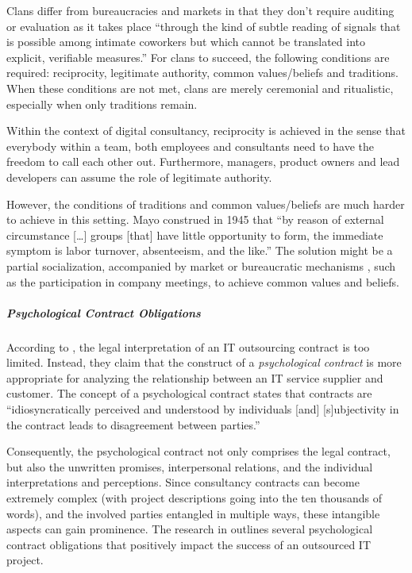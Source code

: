\documentclass[12pt]{article}
\begin{document}
Clans differ from bureaucracies and markets in that they don't require
auditing or evaluation as it takes place ``through the kind of subtle
reading of signals that is possible among intimate coworkers but which
cannot be translated into explicit, verifiable measures.'' \citep[
137]{ouchi1980} For clans to succeed, the following conditions are
required: reciprocity, legitimate authority, common values/beliefs and
traditions. When these conditions are not met, clans are merely
ceremonial and ritualistic, especially when only traditions remain.

Within the context of digital consultancy, reciprocity is achieved in
the sense that everybody within a team, both employees and consultants
need to have the freedom to call each other out. Furthermore, managers,
product owners and lead developers can assume the role of legitimate
authority.

However, the conditions of traditions and common values/beliefs are much
harder to achieve in this setting. Mayo construed in 1945 that ``by
reason of external circumstance {[}\ldots{]} groups {[}that{]} have
little opportunity to form, the immediate symptom is labor turnover,
absenteeism, and the like.'' \citep[ 111]{mayo1945} The solution might
be a partial socialization, accompanied by market or bureaucratic
mechanisms \citep[ 138]{ouchi1980}, such as the participation in company
meetings, to achieve common values and beliefs.

\subparagraph{Psychological Contract
Obligations}\label{psychological-contract-obligations}

According to \citet[357]{ang2004}, the legal interpretation of an IT
outsourcing contract is too limited. Instead, they claim that the
construct of a \emph{psychological contract} is more appropriate for
analyzing the relationship between an IT service supplier and customer.
The concept of a psychological contract states that contracts are
``idiosyncratically perceived and understood by individuals {[}and{]}
{[}s{]}ubjectivity in the contract leads to disagreement between
parties.'' \citep[ 21]{rousseau1993}

Consequently, the psychological contract not only comprises the legal
contract, but also the unwritten promises, interpersonal relations, and
the individual interpretations and perceptions. Since consultancy
contracts can become extremely complex (with project descriptions going
into the ten thousands of words), and the involved parties entangled in
multiple ways, these intangible aspects can gain prominence. The
research in \citet[369-70]{ang2004} outlines several psychological
contract obligations that positively impact the success of an outsourced
IT project.
\end{document}
